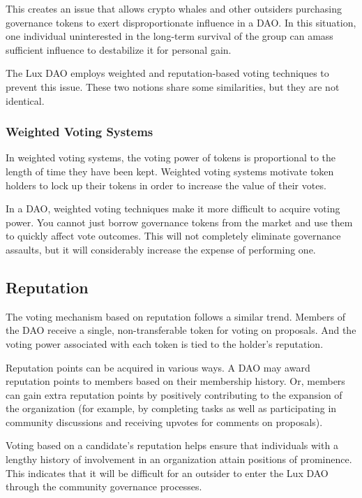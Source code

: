 \documentclass[11pt]{article}
\begin{document}
This creates an issue that allows crypto whales and other outsiders purchasing governance tokens to exert disproportionate influence in a DAO. In this situation, one individual uninterested in the long-term survival of the group can amass sufficient influence to destabilize it for personal gain.


The Lux DAO employs weighted and reputation-based voting techniques to prevent this issue. These two notions share some similarities, but they are not identical.


\subsubsection{Weighted Voting Systems}

In weighted voting systems, the voting power of tokens is proportional to the length of time they have been kept. Weighted voting systems motivate token holders to lock up their tokens in order to increase the value of their votes.


In a DAO, weighted voting techniques make it more difficult to acquire voting power. You cannot just borrow governance tokens from the market and use them to quickly affect vote outcomes. This will not completely eliminate governance assaults, but it will considerably increase the expense of performing one.


\subsection{Reputation}

The voting mechanism based on reputation follows a similar trend. Members of the DAO receive a single, non-transferable token for voting on proposals. And the voting power associated with each token is tied to the holder's reputation.


Reputation points can be acquired in various ways. A DAO may award reputation points to members based on their membership history. Or, members can gain extra reputation points by positively contributing to the expansion of the organization (for example, by completing tasks as well as participating in community discussions and receiving upvotes for comments on proposals).


Voting based on a candidate's reputation helps ensure that individuals with a lengthy history of involvement in an organization attain positions of prominence. This indicates that it will be difficult for an outsider to enter the Lux DAO through the community governance processes.
\end{document}

